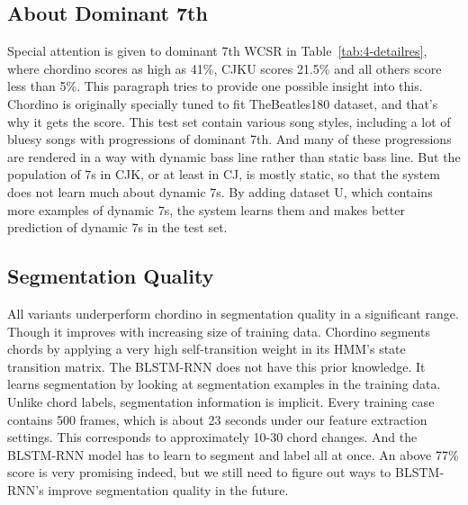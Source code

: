 \subsection{About Dominant 7th}
Special attention is given to dominant 7th WCSR in Table~\ref{tab:4-detailres}, where chordino scores as high as 41\%, CJKU scores 21.5\% and all others score less than 5\%. This paragraph tries to provide one possible insight into this. Chordino is originally specially tuned to fit TheBeatles180 dataset, and that's why it gets the score. This test set contain various song styles, including a lot of bluesy songs with progressions of dominant 7th. And many of these progressions are rendered in a way with dynamic bass line rather than static bass line. But the population of 7s in CJK, or at least in CJ, is mostly static, so that the system does not learn much about dynamic 7s. By adding dataset U, which contains more examples of dynamic 7s, the system learns them and makes better prediction of dynamic 7s in the test set.

\subsection{Segmentation Quality}
All variants underperform chordino in segmentation quality in a significant range. Though it improves with increasing size of training data. Chordino segments chords by applying a very high self-transition weight in its HMM's state transition matrix. The BLSTM-RNN does not have this prior knowledge. It learns segmentation by looking at segmentation examples in the training data. Unlike chord labels, segmentation information is implicit. Every training case contains 500 frames, which is about 23 seconds under our feature extraction settings. This corresponds to approximately 10-30 chord changes. And the BLSTM-RNN model has to learn to segment and label all at once. An above 77\% score is very promising indeed, but we still need to figure out ways to BLSTM-RNN's improve segmentation quality in the future.

